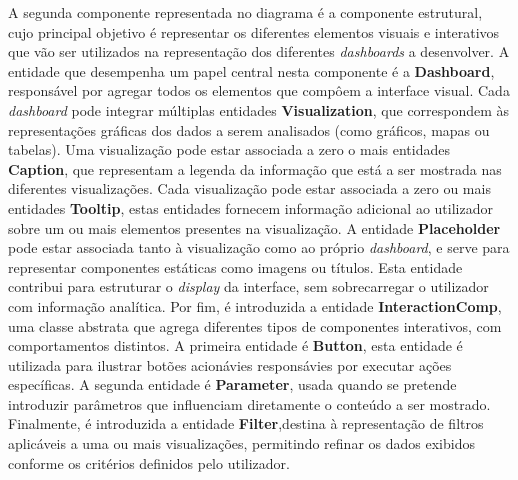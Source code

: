 A segunda componente representada no diagrama é a componente estrutural, cujo principal objetivo é representar os diferentes elementos visuais e interativos que vão ser utilizados na representação dos diferentes \textit{dashboards} a desenvolver. A entidade que desempenha um papel central nesta componente é a \textbf{Dashboard}, responsável por agregar todos os elementos que compôem a interface visual. Cada \textit{dashboard} pode integrar múltiplas entidades \textbf{Visualization}, que correspondem às representações gráficas dos dados a serem analisados (como gráficos, mapas ou tabelas). Uma visualização pode estar associada a zero o mais entidades \textbf{Caption}, que representam a legenda da informação que está a ser mostrada nas diferentes visualizações. Cada visualização pode estar associada a zero ou mais entidades \textbf{Tooltip}, estas entidades fornecem informação adicional ao utilizador sobre um ou mais elementos presentes na visualização. A entidade \textbf{Placeholder} pode estar associada tanto à visualização como ao próprio \textit{dashboard}, e serve para representar componentes estáticas como imagens ou títulos. Esta entidade contribui para estruturar o \textit{display} da interface, sem sobrecarregar o utilizador com informação analítica. Por fim, é introduzida a entidade \textbf{InteractionComp}, uma classe abstrata que agrega diferentes tipos de componentes interativos, com comportamentos distintos. A primeira entidade é \textbf{Button}, esta entidade é utilizada para ilustrar botões acionávies responsávies por executar ações específicas. A segunda entidade é \textbf{Parameter}, usada quando se pretende introduzir parâmetros que influenciam diretamente o conteúdo a ser mostrado. Finalmente, é introduzida a entidade \textbf{Filter},destina à representação de filtros aplicáveis a uma ou mais visualizações, permitindo refinar os dados exibidos conforme os critérios definidos pelo utilizador.

